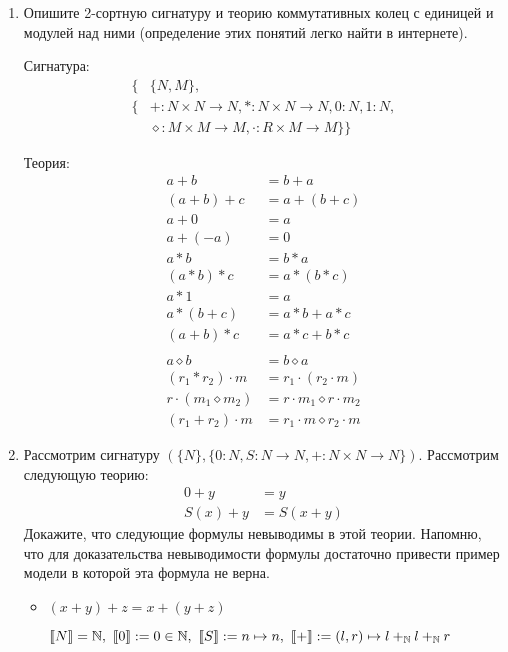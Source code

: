 \begin{enumerate}

\item Опишите 2-сортную сигнатуру и теорию коммутативных колец с единицей и модулей над ними (определение этих 
понятий легко найти в интернете).

Сигнатура: 
\begin{align*}
\{ &\{N, M\}, \\ 
\{
&+:N \times N \rightarrow N, *:N \times N \rightarrow N, 
0:N, 
1:N,\\
&\diamond : M\times M \rightarrow M, 
\cdot:R\times M \rightarrow M 
\}\}
\end{align*}
						   
Теория:
\begin{align*}
	a + b &= b + a \\
	(a + b) + c &= a + (b + c) \\
	a + 0 &= a \\
	a + (-a) &= 0 \\
	a * b &= b * a \\
	(a * b) * c &= a * (b * c) \\
	a * 1 &= a \\
	a * (b + c) &= a * b + a * c \\
	(a + b) * c &= a * c + b * c \\
	\\
	a \diamond b &= b \diamond a \\
	(r_1 * r_2) \cdot m &= r_1 \cdot (r_2 \cdot m) \\
	r\cdot (m_1 \diamond m_2) &= r\cdot m_1 \diamond r \cdot m_2 \\
	(r_1 + r_2) \cdot m &= r_1 \cdot m \diamond r_2 \cdot m
\end{align*}


\item Рассмотрим сигнатуру $(\{N\}, \{ 0 : N, S : N \to N, + : N \times N \to N \})$.
    Рассмотрим следующую теорию:
\begin{align*}
0 + y & = y \\
S(x) + y & = S(x + y)
\end{align*}
Докажите, что следующие формулы невыводимы в этой теории. Напомню, что для доказательства невыводимости формулы 
достаточно привести пример модели в которой эта формула не верна.
\begin{itemize}
\item $(x + y) + z = x + (y + z)$

$\llb N \rrb = \mathbb{N}, \
\llb 0 \rrb := 0 \in \mathbb{N},\
\llb S \rrb := n \mapsto n, \ 
\llb + \rrb := (l, r) \mapsto l +_{\mathbb{N}} l +_{\mathbb{N}} r$


\end{itemize}
\end{enumerate}

